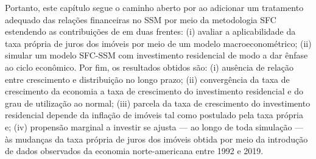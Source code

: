 Portanto, este capítulo segue o caminho aberto por \textcite{brochier_supermultiplier_2018} ao adicionar um tratamento adequado das relações financeiras no SSM por meio da metodologia SFC estendendo as contribuições de \textcite{teixeira_crescimento_2015} em duas frentes:
(i) avaliar a aplicabilidade da taxa própria de juros dos imóveis por meio de um modelo macroeconométrico;
(ii) simular um modelo SFC-SSM com investimento residencial de modo a dar ênfase ao ciclo econômico.
Por fim, os resultados obtidos são:
(i) ausência de relação entre crescimento e distribuição no longo prazo; (ii) convergência
da taxa de crescimento da economia a taxa de crescimento do investimento residencial
e do grau de utilização ao normal; (iii) parcela da taxa de crescimento do investimento residencial depende da inflação de imóveis tal como postulado pela taxa própria e; (iv) propensão marginal a investir se ajusta --- ao longo de toda simulação --- às mudanças da taxa própria de juros dos imóveis obtida por meio da introdução de dados observados da  economia norte-americana entre 1992 e 2019.
 









